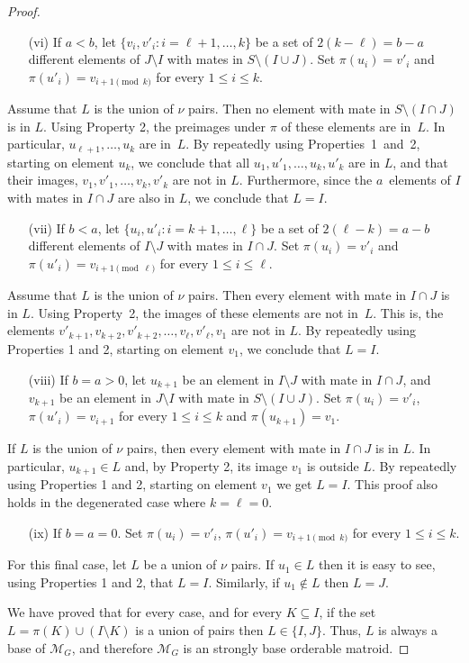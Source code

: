 \documentclass[letterpaper,11pt]{article}
\newcommand{\M}{\mathcal{M}}
\theoremstyle{definition}
\begin{document}
\begin{proof}
\begin{enumerate}
\item[(vi)] If $a < b$, let $\{v_{i},v'_{i}\colon i = \ell+1,\dots,k\}$ be a set of $2(k-\ell)=b-a$ different elements of $J\setminus I$ with mates in $S\setminus (I\cup J)$. Set $\pi(u_i)=v'_i$ and $\pi(u'_i)=v_{i+1\!\pmod k}$ for every $1\leq i \leq k$.
\end{enumerate}
Assume that $L$ is the union of $\nu$ pairs. Then no element with mate in $S\setminus (I \cap J)$ is in $L$. Using Property 2, the preimages under $\pi$ of these elements are in~$L$. In particular, $u_{\ell+1},\dots, u_k$ are in~$L$. By repeatedly using Properties~1~and~2, starting on element $u_k$, we conclude that all $u_1,u'_1,\ldots,u_k,u'_k$ are in $L$, and that their images, $v_1,v'_1,\ldots,v_k,v'_k$ are not in $L$. Furthermore, since the $a$~elements of $I$ with mates in $I\cap J$ are also in $L$, we conclude that $L=I$.

\begin{enumerate}
\item[(vii)] If $b < a$, let $\{u_{i},u'_{i}\colon i = k+1,\dots,\ell\}$ be a set of $2(\ell-k)=a-b$ different elements of $I\setminus J$ with mates in $I\cap J$. Set $\pi(u_i)=v'_i$ and $\pi(u'_i)=v_{i+1\!\pmod \ell}$ for every $1\leq i \leq \ell$.
\end{enumerate}
Assume that $L$ is the union of $\nu$ pairs. Then every element with mate in $I\cap J$ is in $L$. Using Property~2, the images of these elements are not in~$L$. This is, the elements $v'_{k+1}, v_{k+2}, v'_{k+2},\dots, v_\ell, v'_\ell, v_1$ are not in $L$. By repeatedly using Properties 1 and 2, starting on element $v_1$, we conclude that $L=I$.
\begin{enumerate}
\item[(viii)] If $b = a > 0$, let $u_{k+1}$ be an element in $I\setminus J$ with mate in $I\cap J$, and $v_{k+1}$ be an element in $J\setminus I$ with mate in $S\setminus(I\cup J)$. Set $\pi(u_i)=v'_i$, $\pi(u'_i)=v_{i+1}$ for every $1\leq i \leq k$ and $\pi(u_{k+1})=v_1$.
\end{enumerate}
If $L$ is the union of $\nu$ pairs, then every element with mate in $I\cap J$ is in $L$. In particular, $u_{k+1} \in L$ and, by Property 2, its image $v_1$ is outside $L$. By repeatedly using Properties 1 and 2, starting on element $v_{1}$ we get $L=I$. This proof also holds in the degenerated case where $k=\ell=0$.

\begin{enumerate}
  \item[(ix)] If $b=a=0$. Set $\pi(u_i)=v'_i$, $\pi(u'_i)=v_{i+1\!\pmod k}$ for every $1\leq i \leq k$.
\end{enumerate}
For this final case, let $L$ be a union of $\nu$ pairs. If $u_1 \in L$ then it is easy to see, using Properties 1 and 2, that $L=I$. Similarly, if $u_1 \not\in L$ then $L=J$.

We have proved that for every case, and for every $K\subseteq I$, if the set $L=\pi(K) \cup (I \setminus K)$ is a union of pairs then $L\in \{I,J\}$. Thus, $L$ is always a base of $\M_G$, and therefore $\M_G$ is an strongly base orderable matroid. \qedhere
\end{proof}
\end{document}
